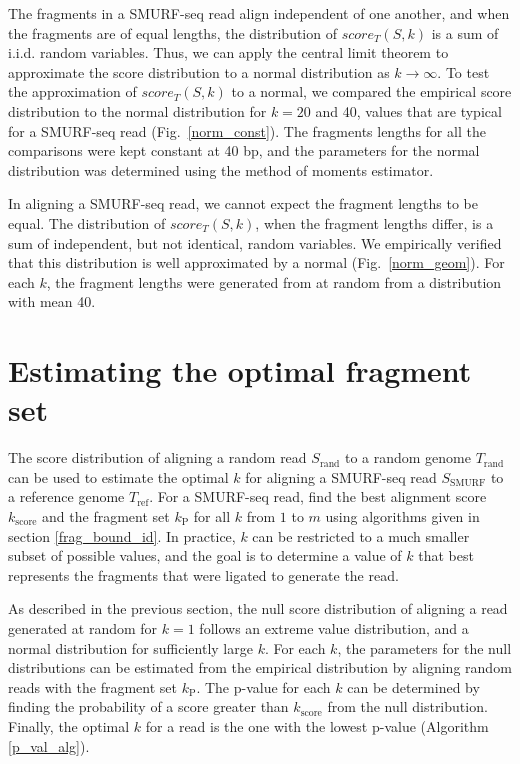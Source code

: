 The fragments in a SMURF-seq read align independent of one another, and
when the fragments are of equal lengths, the distribution of
$score_T(S,k)$ is a sum of i.i.d. random variables. Thus, we can apply
the central limit theorem to approximate the score distribution to a
normal distribution as $k \to \infty$. To test the approximation of
$score_T(S,k)$ to a normal, we compared the empirical score distribution
to the normal distribution for $k = 20$ and 40, values that are typical
for a SMURF-seq read (Fig.~\ref{norm_const}). The fragments lengths for
all the comparisons were kept constant at 40 bp, and the parameters for
the normal distribution was determined using the method of moments
estimator.

In aligning a SMURF-seq read, we cannot expect the fragment lengths to
be equal. The distribution of $score_T(S,k)$, when the fragment lengths
differ, is a sum of independent, but not identical, random variables. We
empirically verified that this distribution is well approximated by a
normal (Fig.~\ref{norm_geom}). For each $k$, the fragment lengths were
generated from at random from a distribution with mean 40.


\section{Estimating the optimal fragment set}
The score distribution of aligning a random read $S_\mathrm{rand}$ to a
random genome $T_\mathrm{rand}$ can be used to estimate the optimal $k$
for aligning a SMURF-seq read $S_\mathrm{SMURF}$ to a reference genome
$T_\mathrm{ref}$.
For a SMURF-seq read, find the best alignment score $k_\mathrm{score}$
and the fragment set $k_\mathrm{P}$ for all $k$ from $1$ to $m$ using
algorithms given in section \ref{frag_bound_id}. In practice, $k$ can be
restricted to a much smaller subset of possible values, and the goal is
to determine a value of $k$ that best represents the fragments that were
ligated to generate the read.
%

As described in the previous section, the null score distribution of
aligning a read generated at random for $k=1$ follows an extreme value
distribution, and a normal distribution for sufficiently large $k$.  For
each $k$, the parameters for the null distributions can be estimated
from the empirical distribution by aligning random reads with the
fragment set $k_\mathrm{P}$.
%
The p-value for each $k$ can be determined by finding the probability of
a score greater than $k_\mathrm{score}$ from the null distribution.
Finally, the optimal $k$ for a read is the one with the lowest p-value
(Algorithm \ref{p_val_alg}).

